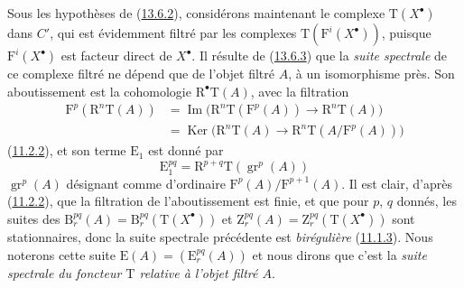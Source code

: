 \begin{env}[13.6.4]
\label{0.13.6.4-fr}
Sous les hypothèses de (\hyperref[0.13.6.2-fr]{13.6.2}), considérons
maintenant le complexe $\mathrm T(X^\bullet)$ dans $C'$, qui est
évidemment filtré par les complexes
$\mathrm T(\mathrm F^i(X^\bullet))$, puisque
$\mathrm F^i(X^\bullet)$ est facteur direct de $X^\bullet$. Il résulte de
(\hyperref[0.13.6.3-fr]{13.6.3}) que la \emph{suite spectrale} de ce
complexe filtré ne dépend que de l'objet filtré $A$, à un isomorphisme
près. Son aboutissement est la cohomologie $\mathrm R^\bullet\mathrm T(A)$,
avec la filtration
\begin{equation}
\label{0.13.6.4.1-fr}
\tag{13.6.4.1}
\begin{split}
\mathrm F^p(\mathrm R^n\mathrm T(A))
&=\operatorname{Im}\bigl(\mathrm R^n\mathrm T(\mathrm F^p(A))
\longrightarrow\mathrm R^n\mathrm T(A)\bigr)\\
&=\operatorname{Ker}\bigl(\mathrm R^n\mathrm T(A)
\longrightarrow\mathrm R^n\mathrm T(A/\mathrm F^p(A))\bigr)
\end{split}
\end{equation}
(\hyperref[0.11.2.2-fr]{11.2.2}), et son terme $\mathrm E_1$ est donné
par
\begin{equation}
\label{0.13.6.4.2-fr}
\tag{13.6.4.2}
\mathrm E_1^{pq}=\mathrm R^{p+q}\mathrm T(\operatorname{gr}^p(A))
\end{equation}
$\operatorname{gr}^p(A)$ désignant comme d'ordinaire
$\mathrm F^p(A)/\mathrm F^{p+1}(A)$. Il est clair, d'après
(\hyperref[0.11.2.2-fr]{11.2.2}), que la filtration de l'aboutissement
est finie, et que pour $p$, $q$ donnés, les suites des
$\mathrm B_r^{pq}(A)=\mathrm B_r^{pq}(\mathrm T(X^\bullet))$ et
$\mathrm Z_r^{pq}(A)=\mathrm Z_r^{pq}(\mathrm T(X^\bullet))$ sont
stationnaires, donc la suite spectrale précédente est \emph{birégulière}
(\hyperref[0.11.1.3-fr]{11.1.3}). Nous noterons cette suite
$\mathrm E(A)=(\mathrm E_r^{pq}(A))$ et nous dirons que c'est la
\emph{suite spectrale du foncteur $\mathrm T$ relative à l'objet filtré
$A$}.
\end{env}


